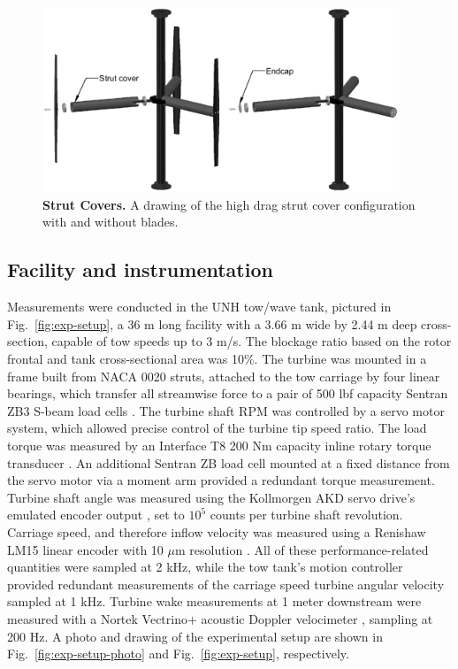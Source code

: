 \documentclass[10pt,letterpaper]{article}
\begin{document}
\begin{figure}[h]
    \includegraphics[width=0.95\textwidth]{figures/strut_covers.eps}
    
    \caption{{\bf Strut Covers.} A drawing of the high drag strut cover
        configuration with and without blades.}
    
    \label{fig:covers}
\end{figure}


\subsection*{Facility and instrumentation}

Measurements were conducted in the UNH tow/wave tank, pictured in
Fig.~\ref{fig:exp-setup}, a 36 m long facility with a 3.66 m wide by 2.44 m deep
cross-section, capable of tow speeds up to 3 m/s. The blockage ratio based on
the rotor frontal and tank cross-sectional area was 10\%. The turbine was
mounted in a frame built from NACA 0020 struts, attached to the tow carriage by
four linear bearings, which transfer all streamwise force to a pair of 500 lbf
capacity Sentran ZB3 S-beam load cells \cite{SentranZB}. The turbine shaft RPM
was controlled by a servo motor system, which allowed precise control of the
turbine tip speed ratio. The load torque was measured by an Interface T8 200 Nm
capacity inline rotary torque transducer \cite{InterfaceT8}. An additional
Sentran ZB load cell mounted at a fixed distance from the servo motor via a
moment arm provided a redundant torque measurement. Turbine shaft angle was
measured using the Kollmorgen AKD servo drive's emulated encoder output
\cite{KollmorgenAKD}, set to $10^5$ counts per turbine shaft revolution.
Carriage speed, and therefore inflow velocity was measured using a Renishaw LM15
linear encoder with 10 $\mu$m resolution \cite{RenishawLM15}. All of these
performance-related quantities were sampled at 2 kHz, while the tow tank's
motion controller provided redundant measurements of the carriage speed turbine
angular velocity sampled at 1 kHz. Turbine wake measurements at 1 meter
downstream were measured with a Nortek Vectrino+ acoustic Doppler velocimeter
\cite{NortekVectrino}, sampling at 200 Hz. A photo and drawing of the
experimental setup are shown in Fig.~\ref{fig:exp-setup-photo} and
Fig.~\ref{fig:exp-setup}, respectively.
\end{document}
